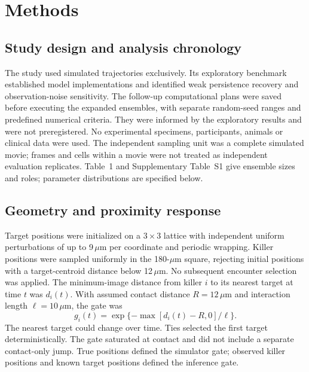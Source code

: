 \documentclass[12pt]{article}
\begin{document}
\section*{Methods}
\subsection*{Study design and analysis chronology}
The study used simulated trajectories exclusively. Its exploratory benchmark established model implementations and identified weak persistence recovery and observation-noise sensitivity. The follow-up computational plans were saved before executing the expanded ensembles, with separate random-seed ranges and predefined numerical criteria. They were informed by the exploratory results and were not preregistered. No experimental specimens, participants, animals or clinical data were used. The independent sampling unit was a complete simulated movie; frames and cells within a movie were not treated as independent evaluation replicates. Table~1 and Supplementary Table~S1 give ensemble sizes and roles; parameter distributions are specified below.

\subsection*{Geometry and proximity response}
Target positions were initialized on a $3\times3$ lattice with independent uniform perturbations of up to 9\,$\mu$m per coordinate and periodic wrapping. Killer positions were sampled uniformly in the 180-$\mu$m square, rejecting initial positions with a target-centroid distance below 12\,$\mu$m. No subsequent encounter selection was applied. The minimum-image distance from killer $i$ to its nearest target at time $t$ was $d_i(t)$. With assumed contact distance $R=12\,\mu$m and interaction length $\ell=10\,\mu$m, the gate was
\begin{equation}
 g_i(t)=\exp\{-\max[d_i(t)-R,0]/\ell\}.
\end{equation}
The nearest target could change over time. Ties selected the first target deterministically. The gate saturated at contact and did not include a separate contact-only jump. True positions defined the simulator gate; observed killer positions and known target positions defined the inference gate.
\end{document}
